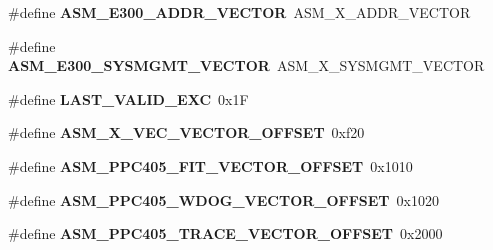 \begin{DoxyCompactItemize}
\item 
\mbox{\label{group__ppc__exc_gad8fe2e93e7b042be02e5211efb12f66f}} 
\#define {\bfseries A\+S\+M\+\_\+\+E300\+\_\+\+A\+D\+D\+R\+\_\+\+V\+E\+C\+T\+OR}~A\+S\+M\+\_\+X\+\_\+\+A\+D\+D\+R\+\_\+\+V\+E\+C\+T\+OR
\item 
\mbox{\label{group__ppc__exc_ga5e8dbc253536bc64db96e271f6c923c3}} 
\#define {\bfseries A\+S\+M\+\_\+\+E300\+\_\+\+S\+Y\+S\+M\+G\+M\+T\+\_\+\+V\+E\+C\+T\+OR}~A\+S\+M\+\_\+X\+\_\+\+S\+Y\+S\+M\+G\+M\+T\+\_\+\+V\+E\+C\+T\+OR
\item 
\mbox{\label{group__ppc__exc_ga340e1e0e60d8940be0f19e83a2178c9d}} 
\#define {\bfseries L\+A\+S\+T\+\_\+\+V\+A\+L\+I\+D\+\_\+\+E\+XC}~0x1F
\item 
\mbox{\label{group__ppc__exc_gaf50b031985163ba87f0d0429b1ee7cdb}} 
\#define {\bfseries A\+S\+M\+\_\+X\+\_\+\+V\+E\+C\+\_\+\+V\+E\+C\+T\+O\+R\+\_\+\+O\+F\+F\+S\+ET}~0xf20
\item 
\mbox{\label{group__ppc__exc_gaa4a4eccd2ca7560d3bd5e0cdf78e246a}} 
\#define {\bfseries A\+S\+M\+\_\+\+P\+P\+C405\+\_\+\+F\+I\+T\+\_\+\+V\+E\+C\+T\+O\+R\+\_\+\+O\+F\+F\+S\+ET}~0x1010
\item 
\mbox{\label{group__ppc__exc_ga99bb2f73253c3fc517bab3f71bce1778}} 
\#define {\bfseries A\+S\+M\+\_\+\+P\+P\+C405\+\_\+\+W\+D\+O\+G\+\_\+\+V\+E\+C\+T\+O\+R\+\_\+\+O\+F\+F\+S\+ET}~0x1020
\item 
\mbox{\label{group__ppc__exc_ga8a9e69c486126f7a749af38d5337841a}} 
\#define {\bfseries A\+S\+M\+\_\+\+P\+P\+C405\+\_\+\+T\+R\+A\+C\+E\+\_\+\+V\+E\+C\+T\+O\+R\+\_\+\+O\+F\+F\+S\+ET}~0x2000
\end{DoxyCompactItemize}
